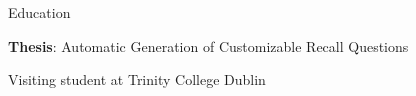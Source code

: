 \documentclass{resume} %
\begin{document}
\begin{rSection}{Education}
\begin{rSubsection}
	\item \textbf{Thesis}: Automatic Generation of Customizable Recall Questions
	\item Visiting student at Trinity College Dublin 
\end{rSubsection}

\end{rSection}
\end{document}
